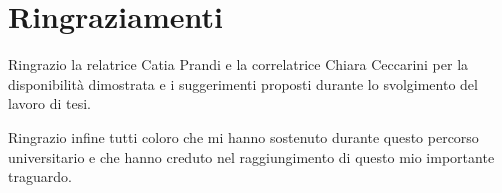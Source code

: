 \rhead[\fancyplain{}{\bfseries \leftmark}]{\fancyplain{}{\bfseries
\thepage}}

\clearpage{\pagestyle{empty}\cleardoublepage}
\chapter*{Ringraziamenti}
\thispagestyle{empty}
Ringrazio la relatrice Catia Prandi e la correlatrice Chiara Ceccarini per la disponibilità dimostrata e i suggerimenti proposti durante lo svolgimento del lavoro di tesi.

Ringrazio infine tutti coloro che mi hanno sostenuto durante questo percorso universitario e che hanno creduto nel raggiungimento di questo mio importante traguardo.